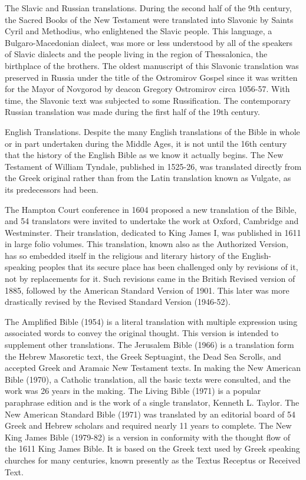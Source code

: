 The Slavic and Russian translations. During the second half of the 9th century, the Sacred Books of the New Testament were translated into Slavonic by Saints Cyril and Methodius, who enlightened the Slavic people. This language, a Bulgaro-Macedonian dialect, was more or less understood by all of the speakers of Slavic dialects and the people living in the region of Thessalonica, the birthplace of the brothers. The oldest manuscript of this Slavonic translation was preserved in Russia under the title of the Ostromirov Gospel since it was written for the Mayor of Novgorod by deacon Gregory Ostromirov circa 1056-57. With time, the Slavonic text was subjected to some Russification. The contemporary Russian translation was made during the first half of the 19th century.

English Translations. Despite the many English translations of the Bible in whole or in part undertaken during the Middle Ages, it is not until the 16th century that the history of the English Bible as we know it actually begins. The New Testament of William Tyndale, published in 1525-26, was translated directly from the Greek original rather than from the Latin translation known as Vulgate, as its predecessors had been.

The Hampton Court conference in 1604 proposed a new translation of the Bible, and 54 translators were invited to undertake the work at Oxford, Cambridge and Westminster. Their translation, dedicated to King James I, was published in 1611 in large folio volumes. This translation, known also as the Authorized Version, has so embedded itself in the religious and literary history of the English-speaking peoples that its secure place has been challenged only by revisions of it, not by replacements for it. Such revisions came in the British Revised version of 1885, followed by the American Standard Version of 1901. This later was more drastically revised by the Revised Standard Version (1946-52).

The Amplified Bible (1954) is a literal translation with multiple expression using associated words to convey the original thought. This version is intended to supplement other translations. The Jerusalem Bible (1966) is a translation form the Hebrew Masoretic text, the Greek Septuagint, the Dead Sea Scrolls, and accepted Greek and Aramaic New Testament texts. In making the New American Bible (1970), a Catholic translation, all the basic texts were consulted, and the work was 26 years in the making. The Living Bible (1971) is a popular paraphrase edition and is the work of a single translator, Kenneth L. Taylor. The New American Standard Bible (1971) was translated by an editorial board of 54 Greek and Hebrew scholars and required nearly 11 years to complete. The New King James Bible (1979-82) is a version in conformity with the thought flow of the 1611 King James Bible. It is based on the Greek text used by Greek speaking churches for many centuries, known presently as the Textus Receptus or Received Text.

